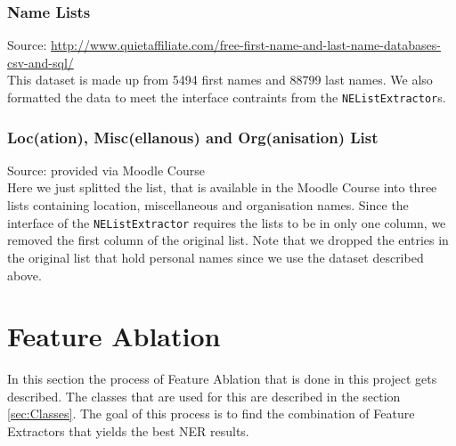 \documentclass[11pt, english]{article}
\begin{document}
\subsubsection*{Name Lists}
Source: \url{http://www.quietaffiliate.com/free-first-name-and-last-name-databases-csv-and-sql/}\\
This dataset is made up from 5494 first names and 88799 last names. We also formatted the data to meet the interface contraints from the \verb/NEListExtractor/s. 

\subsubsection*{Loc(ation), Misc(ellanous) and Org(anisation) List}
Source: provided via Moodle Course\\
Here we just splitted the list, that is available in the Moodle Course into three lists containing location, miscellaneous and organisation names. Since the interface of the \verb/NEListExtractor/ requires the lists to be in only one column, we removed the first column of the original list. Note that we dropped the entries in the original list that hold personal names since we use the dataset described above.



\section{Feature Ablation}
\label{sec:Ablation}
In this section the process of Feature Ablation that is done in this project gets described. The classes that are used for this are described in the section \ref{sec:Classes}. The goal of this process is to find the combination of Feature Extractors that yields the best NER results.
\end{document}

